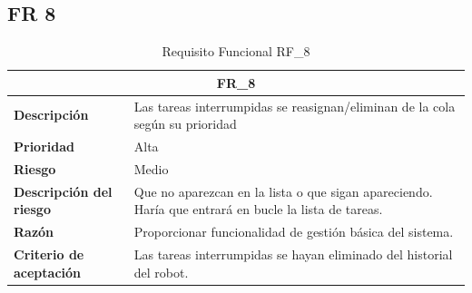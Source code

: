 \documentclass{scrreprt}
\begin{document}
\subsection{FR 8}
    \begin{table}[H]
    
    \label{tab:my-table}
    
    \begin{tabular}{|p{5cm}|p{11cm}|}
    \hline
    \multicolumn{2}{|c|}{\textbf{FR_8}} \\
    \hline
    \textbf{Descripción  }                      & Las tareas interrumpidas se reasignan/eliminan de la cola según su prioridad
                                                                             \\ \hline
    \textbf{Prioridad}                          & Alta                                                                                              \\ \hline
    \textbf{Riesgo}                          & Medio                                                                                                \\ \hline
    \textbf{Descripción del riesgo}                    & Que no aparezcan en la lista o que sigan apareciendo. Haría que entrará en bucle la lista de tareas.                                                                              \\ \hline
    \textbf{Razón}                   & Proporcionar funcionalidad de gestión básica del sistema.                                                                                               \\ \hline
     \textbf{Criterio de aceptación}                    & Las tareas interrumpidas se hayan eliminado del historial del robot.  \\ \hline
    \end{tabular}%
    
    \caption{Requisito Funcional RF_8}
\end{table}
\end{document}
